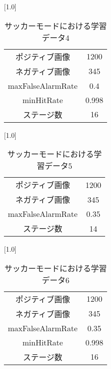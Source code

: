\begin{table}[h]
  \centering
  \scalebox{1.0}[1.0]{
   \begin{tabular}{cc}	\hline
    ポジティブ画像 & 1200  \\    
    ネガティブ画像 & 345  \\
    maxFalseAlarmRate & 0.4 \\
    minHitRate & 0.998 \\
    ステージ数 & 16  \\ \hline
   \end{tabular}
  } 
  \caption{サッカーモードにおける学習データ4}
  \label{soccerstudy}
\end{table}


\begin{table}[h]
  \centering
  \scalebox{1.0}[1.0]{
   \begin{tabular}{cc}	\hline
    ポジティブ画像 & 1200  \\    
    ネガティブ画像 & 345  \\
    maxFalseAlarmRate & 0.35 \\
    ステージ数 & 14  \\ \hline
   \end{tabular}
  } 
  \caption{サッカーモードにおける学習データ5}
  \label{soccerstudy}
\end{table}


\begin{table}[h]
  \centering
  \scalebox{1.0}[1.0]{
   \begin{tabular}{cc}	\hline
    ポジティブ画像 & 1200  \\    
    ネガティブ画像 & 345  \\
    maxFalseAlarmRate & 0.35 \\
    minHitRate & 0.998 \\
    ステージ数 & 16  \\ \hline
   \end{tabular}
  } 
  \caption{サッカーモードにおける学習データ6}
  \label{soccerstudy}
\end{table}
